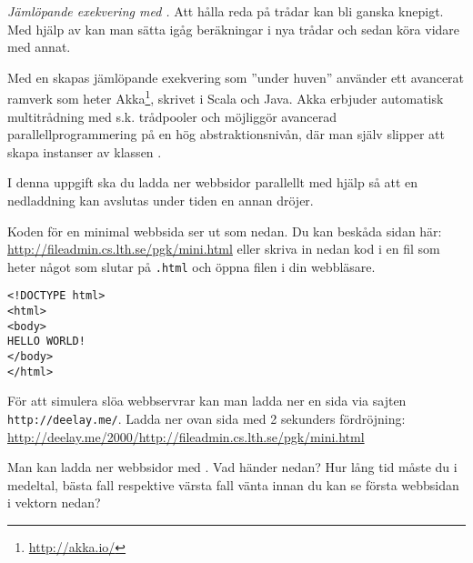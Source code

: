 \Task \emph{Jämlöpande exekvering med .} Att hålla reda på trådar kan bli ganska knepigt. Med hjälp av  kan man sätta igåg beräkningar i nya trådar och sedan köra vidare med annat. 

\begin{Background}
Med en  skapas jämlöpande exekvering som ''under huven'' använder ett avancerat ramverk som heter Akka\footnote{\url{http://akka.io/}}, skrivet i Scala och Java. Akka erbjuder automatisk  multitrådning med s.k. trådpooler och möjliggör avancerad parallellprogrammering på en hög  abstraktionsnivån, där man själv slipper att skapa instanser av klassen . 
\end{Background}

I denna uppgift ska du ladda ner webbsidor parallellt med hjälp  så att en nedladdning kan avslutas under tiden en annan dröjer.  

\Subtask Koden för en minimal webbsida ser ut som nedan. Du kan beskåda sidan här: \url{http://fileadmin.cs.lth.se/pgk/mini.html} eller skriva in nedan kod i en fil som heter något som slutar på \texttt{.html} och öppna filen i din webbläsare.

\begin{verbatim}
<!DOCTYPE html>
<html>
<body>
HELLO WORLD!
</body>
</html>
\end{verbatim}

\Subtask För att simulera slöa webbservrar kan man ladda ner en sida via sajten \texttt{http://deelay.me/}. Ladda ner ovan sida med 2 sekunders fördröjning:\\
\url{http://deelay.me/2000/http://fileadmin.cs.lth.se/pgk/mini.html}

\Subtask Man kan ladda ner webbsidor med . Vad händer nedan? Hur lång tid måste du i medeltal, bästa fall respektive värsta fall vänta innan du kan se första webbsidan i vektorn  nedan?


